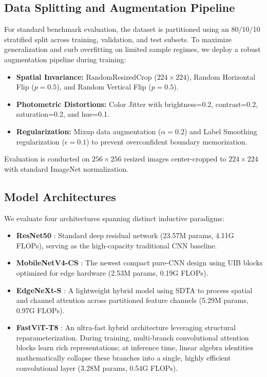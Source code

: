 \documentclass[conference]{IEEEtran}
\begin{document}
\subsection{Data Splitting and Augmentation Pipeline}
For standard benchmark evaluation, the dataset is partitioned using an 80/10/10 stratified split across training, validation, and test subsets. To maximize generalization and curb overfitting on limited sample regimes, we deploy a robust augmentation pipeline during training:
\begin{itemize}
    \item \textbf{Spatial Invariance:} RandomResizedCrop ($224 \times 224$), Random Horizontal Flip ($p=0.5$), and Random Vertical Flip ($p=0.5$).
    \item \textbf{Photometric Distortions:} Color Jitter with brightness=0.2, contrast=0.2, saturation=0.2, and hue=0.1.
    \item \textbf{Regularization:} Mixup data augmentation ($\alpha=0.2$) \cite{mixup} and Label Smoothing regularization ($\epsilon=0.1$) to prevent overconfident boundary memorization.
\end{itemize}
Evaluation is conducted on $256 \times 256$ resized images center-cropped to $224 \times 224$ with standard ImageNet normalization.

\subsection{Model Architectures}
We evaluate four architectures spanning distinct inductive paradigms:
\begin{itemize}
    \item \textbf{ResNet50} \cite{resnet}: Standard deep residual network (23.57M params, 4.11G FLOPs), serving as the high-capacity traditional CNN baseline.
    \item \textbf{MobileNetV4-CS} \cite{mobilenetv4}: The newest compact pure-CNN design using UIB blocks optimized for edge hardware (2.53M params, 0.19G FLOPs).
    \item \textbf{EdgeNeXt-S} \cite{edgenext}: A lightweight hybrid model using SDTA to process spatial and channel attention across partitioned feature channels (5.29M params, 0.97G FLOPs).
    \item \textbf{FastViT-T8} \cite{fastvit}: An ultra-fast hybrid architecture leveraging structural reparameterization. During training, multi-branch convolutional attention blocks learn rich representations; at inference time, linear algebra identities mathematically collapse these branches into a single, highly efficient convolutional layer (3.28M params, 0.54G FLOPs).
\end{itemize}
\end{document}

